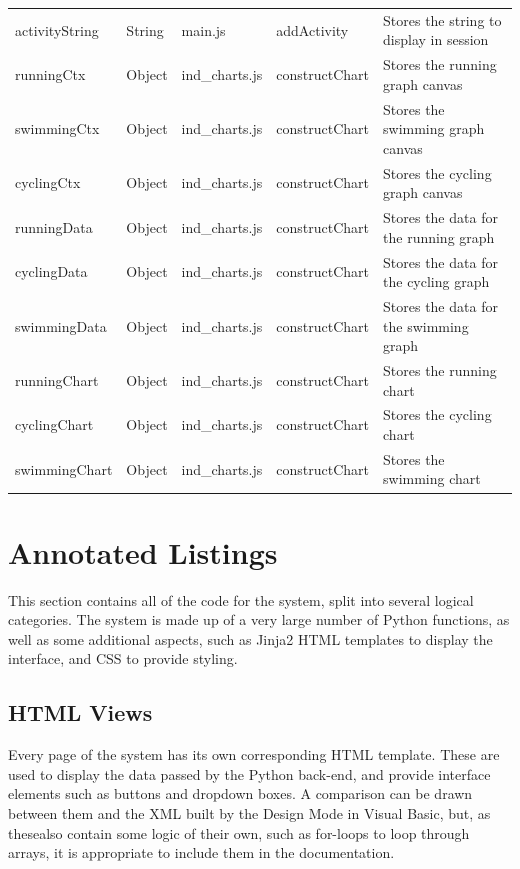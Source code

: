 \documentclass{article}[12pt,a4paper]
\begin{document}
\begin{table}[h]
\begin{tabular}{lllll}
activityString    & String        & main.js             & addActivity               & Stores the string to display in session \\
runningCtx        & Object        & ind\_charts.js      & constructChart            & Stores the running graph canvas         \\
swimmingCtx       & Object        & ind\_charts.js      & constructChart            & Stores the swimming graph canvas        \\
cyclingCtx        & Object        & ind\_charts.js      & constructChart            & Stores the cycling graph canvas         \\
runningData       & Object        & ind\_charts.js      & constructChart            & Stores the data for the running graph   \\
cyclingData       & Object        & ind\_charts.js      & constructChart            & Stores the data for the cycling graph   \\
swimmingData      & Object        & ind\_charts.js      & constructChart            & Stores the data for the swimming graph  \\
runningChart      & Object        & ind\_charts.js      & constructChart            & Stores the running chart                \\
cyclingChart      & Object        & ind\_charts.js      & constructChart            & Stores the cycling chart                \\
swimmingChart     & Object        & ind\_charts.js      & constructChart            & Stores the swimming chart              
\end{tabular}
\end{table}

\section{Annotated Listings}
This section contains all of the code for the system, split into several logical categories. The system is made up of a very large number of Python functions, as well as some additional aspects, such as Jinja2 HTML templates to display the interface, and CSS to provide styling.

\subsection{HTML Views}
Every page of the system has its own corresponding HTML template. These are used to display the data passed by the Python back-end, and provide interface elements such as buttons and dropdown boxes. A comparison can be drawn between them and the XML built by the Design Mode in Visual Basic, but, as thesealso contain some logic of their own, such as for-loops to loop through arrays, it is appropriate to include them in the documentation.
\end{document}

